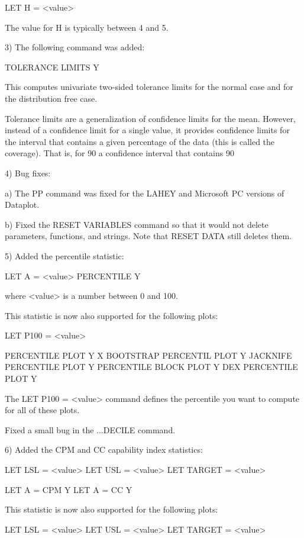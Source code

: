 {                LET H = <value>

            The value for H is typically between 4 and 5.

 3) The following command was added:

    TOLERANCE LIMITS Y

    This computes univariate two-sided tolerance limits for the normal
    case and for the distribution free case.

    Tolerance limits are a generalization of confidence limits
    for the mean.  However, instead of a confidence limit for a
    single value, it provides confidence limits for the interval
    that contains a given percentage of the data (this is called
    the coverage).  That is, for 90%
    a confidence interval that contains 90%

 4) Bug fixes:

    a) The PP command was fixed for the LAHEY and Microsoft PC
       versions of Dataplot.

    b) Fixed the RESET VARIABLES command so that it would not
       delete parameters, functions, and strings.  Note that
       RESET DATA still deletes them.

 5) Added the percentile statistic:

       LET A = <value> PERCENTILE Y

    where <value> is a number between 0 and 100.

    This statistic is now also supported for the following plots:

       LET P100 = <value>

       PERCENTILE PLOT Y X
       BOOTSTRAP PERCENTIL PLOT Y
       JACKNIFE PERCENTILE PLOT Y
       PERCENTILE BLOCK PLOT Y
       DEX PERCENTILE PLOT Y

    The LET P100 = <value> command defines the percentile you
    want to compute for all of these plots.

    Fixed a small bug in the ...DECILE command.

 6) Added the CPM and CC capability index statistics:

       LET LSL = <value>
       LET USL = <value>
       LET TARGET = <value>

       LET A = CPM Y
       LET A = CC Y

    This statistic is now also supported for the following plots:

       LET LSL = <value>
       LET USL = <value>
       LET TARGET = <value>

}
